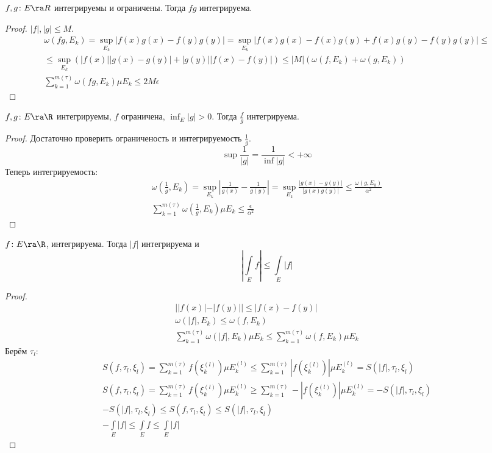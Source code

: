 \item
	$f, g\colon E \ra R$ интегрируемы и ограничены.
	Тогда $fg$ интегрируема.
	\begin{proof}
		$|f|, |g| \le M$.
		\begin{gather*}
			\omega(fg, E_k) = \sup_{E_k} |f(x)g(x) - f(y)g(y)| = \sup_{E_k} |f(x)g(x) - f(x)g(y) + f(x)g(y) - f(y)g(y)| \le \\
			\le \sup_{E_k} (|f(x)| |g(x) - g(y)| + |g(y)| |f(x) - f(y)|) \le |M| (\omega(f, E_k) + \omega(g, E_k)) \\
			\sum_{k=1}^{m(\tau)} \omega(fg, E_k) \mu E_k \le 2M\epsilon
		\end{gather*}
	\end{proof}

\item
	$f, g\colon E \ra \R$ интегрируемы, $f$ ограничена, $\inf_E |g| > 0$.
	Тогда $\frac{f}g$ интегрируема.
	\begin{proof}
		Достаточно проверить ограниченость и интегрируемость $\frac1g$.
		\[ \sup \frac1{|g|} = \frac1{\inf |g|} < +\infty \]
		Теперь интегрируемость:
		\begin{gather*}
			\omega \left( \frac1g, E_k \right) = \sup_{E_k} \left| \frac1{g(x)} - \frac1{g(y)} \right| =
				\sup_{E_k} \frac{|g(x) - g(y)|}{|g(x)g(y)|} \le \frac{\omega(g, E_k)}{\alpha^2} \\
			\sum_{k=1}^{m(\tau)} \omega \left(\frac1g, E_k\right) \mu E_k \le \frac\epsilon{\alpha^2}
		\end{gather*}
	\end{proof}

\item
	$f\colon E \ra \R$, интегрируема.
	Тогда $|f|$ интегрируема и
	\[ \left|\int\limits_E f\right| \le \int\limits_E |f| \]
	\begin{proof}
		\begin{gather*}
			||f(x)| - |f(y)|| \le |f(x) - f(y)| \\
			\omega(|f|, E_k) \le \omega(f, E_k) \\
			\sum_{k=1}^{m(\tau)} \omega(|f|, E_k) \mu E_k \le \sum_{k=1}^{m(\tau)} \omega(f, E_k) \mu E_k
		\end{gather*}
		Берём $\tau_l$:
		\begin{gather*}
			S(f, \tau_l, \xi_l) = \sum_{k=1}^{m(\tau)} f\left(\xi_k^{(l)}\right) \mu E_k^{(l)} \le
				\sum_{k=1}^{m(\tau)} |f\left(\xi_k^{(l)}\right)| \mu E_k^{(l)} = S(|f|, \tau_l, \xi_l) \\
			S(f, \tau_l, \xi_l) = \sum_{k=1}^{m(\tau)} f\left(\xi_k^{(l)}\right) \mu E_k^{(l)} \ge
				\sum_{k=1}^{m(\tau)} -|f\left(\xi_k^{(l)}\right)| \mu E_k^{(l)} = -S(|f|, \tau_l, \xi_l) \\
			-S(|f|, \tau_l, \xi_l) \le S(f, \tau_l, \xi_l) \le S(|f|, \tau_l, \xi_l) \\
			-\int\limits_E |f| \le \int\limits_E f \le \int\limits_E |f|
		\end{gather*}
	\end{proof}

